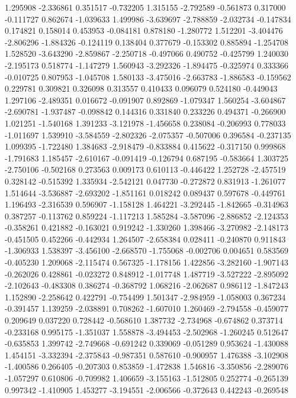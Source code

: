 1.295908
-2.336861
0.351517
-0.732205
1.315155
-2.792589
-0.561873
0.317000
-0.111727
0.862674
-1.039633
1.499986
-3.639697
-2.788859
-2.032734
-0.147834
0.174821
0.158014
0.453953
-0.084181
0.878180
-1.280772
1.512201
-3.404476
-2.806296
-1.884326
-0.124119
0.138404
0.377679
-0.153302
0.885894
-1.254708
1.528520
-3.643290
-2.859867
-2.250718
-0.497066
0.490752
-0.425799
1.240030
-2.195173
0.518774
-1.147279
1.560943
-3.292326
-1.894475
-0.325974
0.333366
-0.010725
0.807953
-1.045708
1.580133
-3.475016
-2.663783
-1.886583
-0.159562
0.229781
0.309821
0.326098
0.313557
0.410433
0.096079
0.524180
-0.449043
1.297106
-2.489351
0.016672
-0.091907
0.892869
-1.079347
1.560254
-3.604867
-2.690781
-1.937487
-0.098842
0.144316
0.331840
0.233226
0.494371
-0.266900
1.021251
-1.540168
1.391233
-3.121978
-1.456658
0.238084
-0.206993
0.778033
-1.011697
1.539910
-3.584559
-2.802326
-2.075357
-0.507006
0.396584
-0.237135
1.099395
-1.722480
1.384683
-2.918479
-0.833884
0.415622
-0.317150
0.999868
-1.791683
1.185457
-2.610167
-0.091419
-0.126794
0.687195
-0.583664
1.303725
-2.750106
-0.502168
0.273563
0.009173
0.610113
-0.446422
1.252728
-2.457519
0.328142
-0.515392
1.335934
-2.542121
0.047730
-0.272872
0.831913
-1.261077
1.514644
-3.536887
-2.693202
-1.851161
0.018242
0.089437
0.597678
-0.449761
1.196493
-2.316539
0.596907
-1.158128
1.464221
-3.292445
-1.842665
-0.314963
0.387257
-0.113762
0.859224
-1.117213
1.585284
-3.587096
-2.886852
-2.124353
-0.358261
0.421882
-0.163021
0.919242
-1.330260
1.398466
-3.270982
-2.148173
-0.451505
0.452266
-0.442934
1.264507
-2.658384
0.028411
-0.240870
0.911843
-1.306933
1.538397
-3.456100
-2.668570
-1.755068
-0.002706
0.004651
0.583569
-0.405230
1.209068
-2.115474
0.567325
-1.178156
1.422856
-3.282160
-1.907143
-0.262026
0.428861
-0.023272
0.848912
-1.017748
1.487719
-3.527222
-2.895092
-2.102643
-0.483308
0.386274
-0.368792
1.068216
-2.062687
0.986112
-1.847243
1.152890
-2.258642
0.422791
-0.754499
1.501347
-2.984959
-1.058003
0.367234
-0.391457
1.139259
-2.038891
0.708262
-1.607010
1.260469
-2.794558
-0.459077
0.209649
0.037220
0.728442
-0.568610
1.387732
-2.734968
-0.674862
0.373714
-0.233168
0.995175
-1.351037
1.558878
-3.494453
-2.502968
-1.260245
0.512647
-0.635853
1.399742
-2.749668
-0.691242
0.339069
-0.051289
0.953624
-1.430088
1.454151
-3.332394
-2.375843
-0.987351
0.587610
-0.900957
1.476388
-3.102908
-1.400586
0.266405
-0.207303
0.853859
-1.472838
1.546816
-3.350856
-2.289076
-1.057297
0.610806
-0.709982
1.406659
-3.155163
-1.512805
0.252774
-0.265139
0.997342
-1.410905
1.453277
-3.194551
-2.006566
-0.372643
0.442243
-0.269548
